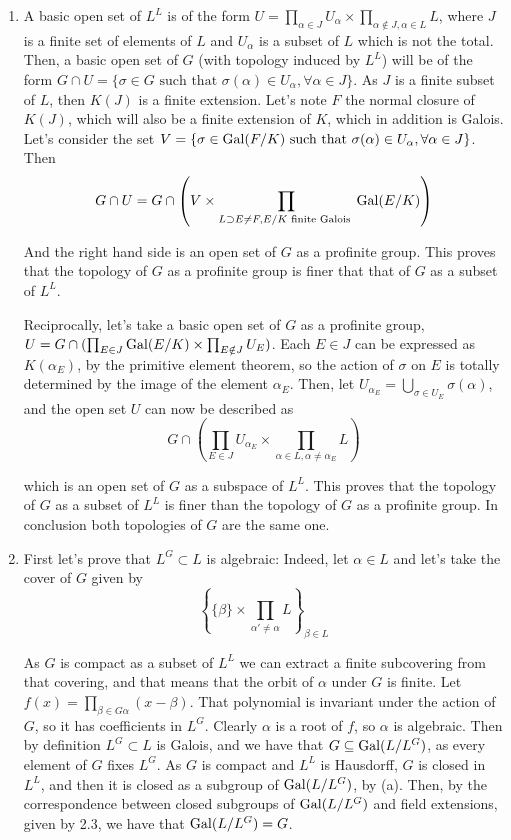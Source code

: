 \begin{sol}
	\begin{enumerate}[label=\alph*)]
		\item A basic open set of $L^L$ is of the form $U = \prod_{\alpha \in J} U_{\alpha} \times \prod_{\alpha \notin J, \alpha \in L} L$, where $J$ is a finite set of elements of $L$ and $U_{\alpha}$ is a subset of $L$ which is not the total. Then, a basic open set of $G$ (with topology induced by $L^L$) will be of the form $G \cap U = \{\sigma \in G \text{ such that } \sigma(\alpha) \in U_\alpha, \forall \alpha \in J \}$. As $J$ is a finite subset of $L$, then $K(J)$ is a finite extension. Let's note $F$ the normal closure of $K(J)$, which will also be a finite extension of $K$, which in addition is Galois. Let's consider the set $V = \{ \sigma \in \mathrm{Gal}(F/K) \text{ such that } \sigma(\alpha) \in U_{\alpha}, \forall \alpha \in J\}$. Then \[
			G \cap U = G \cap \left (V \times \prod_{L \supset E \neq F, E/K \text{ finite Galois }} \mathrm{Gal}(E/K) \right )
		\]

		And the right hand side is an open set of $G$ as a profinite group. This proves that the topology of $G$ as a profinite group is finer that that of $G$ as a subset of $L^L$.

		Reciprocally, let's take a basic open set of $G$ as a profinite group, $U = G \cap ( \prod_{E \in J} \mathrm{Gal}(E/K) \times \prod_{E \notin J} U_E)$. Each $E \in J$ can be expressed as $K(\alpha_E)$, by the primitive element theorem, so the action of $\sigma$ on $E$ is totally determined by the image of the element $\alpha_E$. Then, let $U_{\alpha_E} = \bigcup_{\sigma \in U_E} \sigma(\alpha)$, and the open set $U$ can now be described as 
		\[
			G \cap \left ( \prod_{E \in J} U_{\alpha_E} \times \prod_{\alpha \in L, \alpha \neq \alpha_E} L \right )
		\]

		which is an open set of $G$ as a subspace of $L^L$. This proves that the topology of $G$ as a subset of $L^L$ is finer than the topology of $G$ as a profinite group. In conclusion both topologies of $G$ are the same one.

		\item First let's prove that $L^G \subset L$ is algebraic: Indeed, let $\alpha \in L$ and let's take the cover of $G$ given by
		\[
			\left \{ \{\beta\} \times \prod_{\alpha' \neq \alpha} L \right \}_{\beta \in L}
		\] 

		As $G$ is compact as a subset of $L^L$ we can extract a finite subcovering from that covering, and that means that the orbit of $\alpha$ under $G$ is finite. Let $f(x) = \prod_{\beta \in G\alpha} (x-\beta)$. That polynomial is invariant under the action of $G$, so it has coefficients in $L^G$. Clearly $\alpha$ is a root of $f$, so $\alpha$ is algebraic. Then by definition $L^G \subset L$ is Galois, and we have that $G \subseteq \mathrm{Gal}(L/L^G)$, as every element of $G$ fixes $L^G$. As $G$ is compact and $L^L$ is Hausdorff, $G$ is closed in $L^L$, and then it is closed as a subgroup of $\mathrm{Gal}(L/L^G)$, by (a). Then, by the correspondence between closed subgroups of $\mathrm{Gal}(L/L^G)$ and field extensions, given by 2.3, we have that $\mathrm{Gal}(L/L^G) = G$.


\end{enumerate}
\end{sol}
